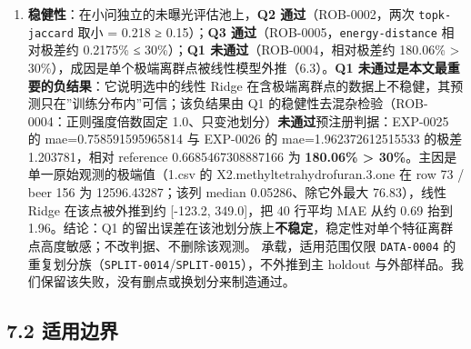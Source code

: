 \documentclass[
  11pt,
]{ctexart}
\begin{document}
\begin{enumerate}
  3.486382987639628→3.501495913841147）与感官画像一致性（profile-consistency
  0.49384528514963294，按 Q1
  训练行拟合的代理模型近似、非实测评分）；Pils/Lager→Tripel
  的跨风格迁移在 7 个缺陷化合物逐格上不恶化（不恶化率
  1），但源谱自身满足 7 条约束的比例为 0、迁移后仍为 0，即''不恶化 ≠
  达标''。）。这是生成合理性/约束满足，不是酿造验证。
\item
  \textbf{稳健性}：在小问独立的未曝光评估池上，\textbf{Q2
  通过}（ROB-0002，两次 \texttt{topk-jaccard} 取小 = 0.218 ≥
  0.15）；\textbf{Q3 通过}（ROB-0005，\texttt{energy-distance}
  相对极差约 0.2175\% ≤ 30\%）；\textbf{Q1 未通过}（ROB-0004，相对极差约
  180.06\% \textgreater{}
  30\%），成因是单个极端离群点被线性模型外推（6.3）。\textbf{Q1
  未通过是本文最重要的负结果}：它说明选中的线性 Ridge
  在含极端离群点的数据上不稳健，其预测只在''训练分布内''可信；该负结果由
  Q1 的稳健性去混杂检验（ROB-0004：正则强度倍数固定
  1.0、只变池划分）\textbf{未通过}预注册判据：EXP-0025 的
  mae=0.758591595965814 与 EXP-0026 的 mae=1.962372612515533 的极差
  1.203781，相对 reference 0.6685467308887166 为 \textbf{180.06\%
  \textgreater{} 30\%}。主因是单一原始观测的极端值（1.csv 的
  X2.methyltetrahydrofuran.3.one 在 row 73 / beer 156 为
  12596.43287；该列 median 0.05286、除它外最大 76.83），线性 Ridge
  在该点被外推到约 {[}-123.2, 349.0{]}，把 40 行平均 MAE 从约 0.69 抬到
  1.96。结论：Q1
  的留出误差在该池划分族上\textbf{不稳定}，稳定性对单个特征离群点高度敏感；不改判据、不删除该观测。
  承载，适用范围仅限 \texttt{DATA-0004}
  的重复划分族（\texttt{SPLIT-0014}/\texttt{SPLIT-0015}），不外推到主
  holdout 与外部样品。我们保留该失败，没有删点或换划分来制造通过。
\end{enumerate}

\subsection{7.2 适用边界}\label{ux9002ux7528ux8fb9ux754c}
\end{document}
